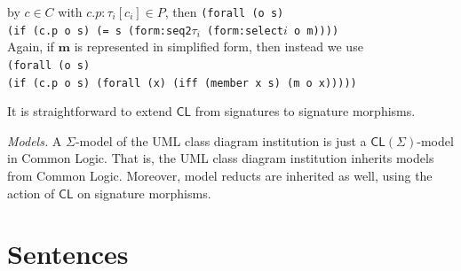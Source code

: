 \documentclass[10pt,fleqn,%
\ifpretendfinal
final%
\else
draft%
\fi,
]{scrreprt}
\newcommand*{\CL}{\ensuremath{\mathsf{CL}}\xspace}
\newcommand{\white}[1]{{\color{white}{#1}}}
\newcommand{\qqquad}{\white{x}\qquad}
\begin{document}
\begin{itemize}
by $c \in C$ with $c.p : \tau_i[c_i] \in P$, then
\texttt{(forall (o s)\\
\qqquad (if (c.p o s) (= s (form:seq2$\tau_i$ (form:select$i$ o m))))}\\
Again, if $\mathbf{m}$ is represented in simplified form, then instead we use\\
\texttt{(forall (o s)\\
\qqquad (if (c.p o s) (forall (x) (iff (member x s) (m o x)))))}
\end{itemize}


It is straightforward to extend $\CL$ from signatures to signature morphisms.

\smallskip\noindent
\textit{Models.}
A $\Sigma$-model of the UML class diagram institution is just a
$\CL(\Sigma)$-model in Common Logic. That is, the UML class diagram
institution inherits models from Common Logic. Moreover, model reducts
are inherited as well, using the action of $\CL$ on signature morphisms.


\section{Sentences}
\end{document}
